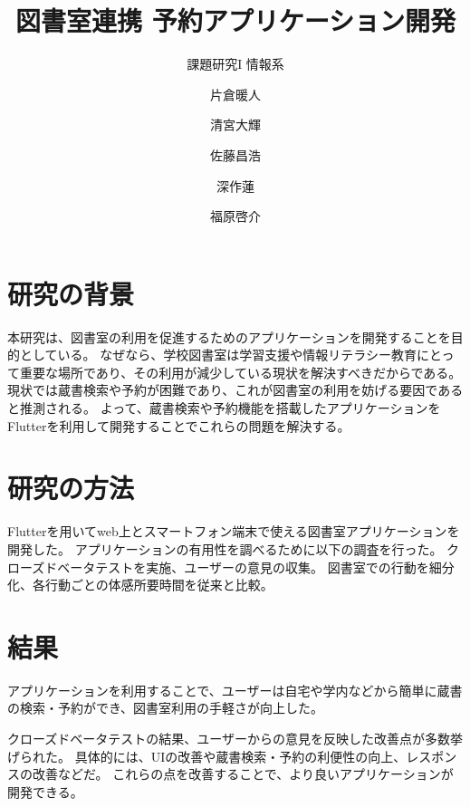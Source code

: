 \documentclass[twocolumn]{jsarticle}
\begin{document}
\title{図書室連携 予約アプリケーション開発}  
\author{課題研究I 情報系 \and 片倉暖人 \and 清宮大輝 \and 佐藤昌浩 \and 深作蓮 \and 福原啓介}
\date{\vspace{-10mm}}


\section{研究の背景}
本研究は、図書室の利用を促進するためのアプリケーションを開発することを目的としている。
なぜなら、学校図書室は学習支援や情報リテラシー教育にとって重要な場所であり、その利用が減少している現状を解決すべきだからである。
現状では蔵書検索や予約が困難であり、これが図書室の利用を妨げる要因であると推測される。
よって、蔵書検索や予約機能を搭載したアプリケーションをFlutterを利用して開発することでこれらの問題を解決する。
\section{研究の方法}
Flutterを用いてweb上とスマートフォン端末で使える図書室アプリケーションを開発した。
アプリケーションの有用性を調べるために以下の調査を行った。
クローズドベータテストを実施、ユーザーの意見の収集。
図書室での行動を細分化、各行動ごとの体感所要時間を従来と比較。
\section{結果}
アプリケーションを利用することで、ユーザーは自宅や学内などから簡単に蔵書の検索・予約ができ、図書室利用の手軽さが向上した。

クローズドベータテストの結果、ユーザーからの意見を反映した改善点が多数挙げられた。
具体的には、UIの改善や蔵書検索・予約の利便性の向上、レスポンスの改善などだ。
これらの点を改善することで、より良いアプリケーションが開発できる。
\end{document}
